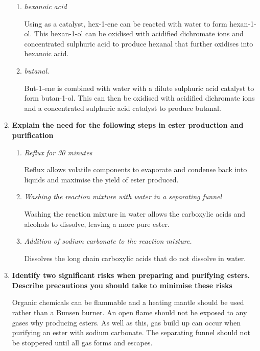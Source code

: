 \documentclass{report}
\begin{document}
\begin{enumerate}
			\begin{enumerate}
				\item \textit{hexanoic acid}

					Using  as a catalyst, hex-1-ene can be reacted with water to form hexan-1-ol. This hexan-1-ol can be oxidised with acidified dichromate ions and concentrated sulphuric acid to produce hexanal that further oxidises into hexanoic acid.

				\item \textit{butanal.}

					But-1-ene is combined with water with a dilute sulphuric acid catalyst to form butan-1-ol. This can then be oxidised with acidified dichromate ions and a concentrated sulphuric acid catalyst to produce butanal.
			\end{enumerate}

		\item \textbf{Explain the need for the following steps in ester production and purification}

			\begin{enumerate}
				\item \textit{Reflux for 30 minutes}

					Reflux allows volatile components to evaporate and condense back into liquids and maximise the yield of ester produced.

				\item \textit{Washing the reaction mixture with water in a separating funnel}

					Washing the reaction mixture in water allows the carboxylic acids and alcohols to dissolve, leaving a more pure ester.

				\item \textit{Addition of sodium carbonate to the reaction mixture.}

					Dissolves the long chain carboxylic acids that do not dissolve in water.
			\end{enumerate}

		\item \textbf{Identify two significant risks when preparing and purifying esters. Describe precautions you should take to minimise these risks}

			Organic chemicals can be flammable and a heating mantle should be used rather than a Bunsen burner. An open flame should not be exposed to any gases why producing esters. As well as this, gas build up can occur when purifying an ester with sodium carbonate. The separating funnel should not be stoppered until all gas forms and escapes.

	\end{enumerate}
\end{document}
